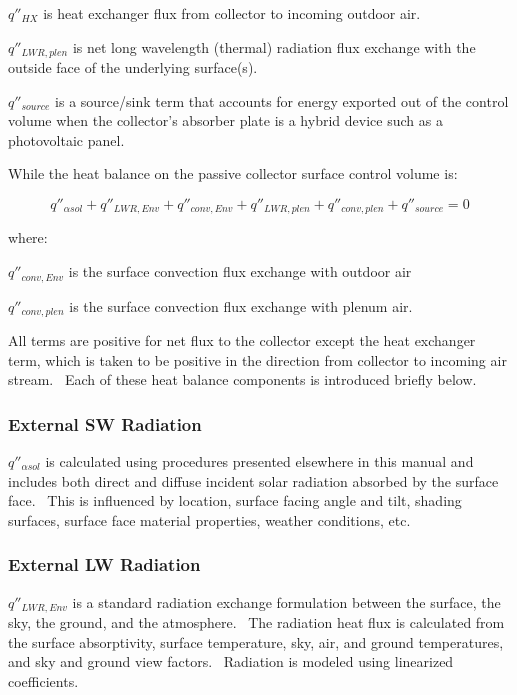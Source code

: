 \(q''_{HX}\) is heat exchanger flux from collector to incoming outdoor air.

\(q''_{LWR,plen}\) is net long wavelength (thermal) radiation flux exchange with the outside face of the underlying surface(s).

\({q''_{source}}\) is a source/sink term that accounts for energy exported out of the control volume when the collector's absorber plate is a hybrid device such as a photovoltaic panel.

While the heat balance on the passive collector surface control volume is:

\begin{equation}
{q''_{\alpha sol}} + {q''_{LWR,Env}} + {q''_{conv,Env}} + {q''_{LWR,plen}} + {q''_{conv,plen}} + {q''_{source}} = 0
\end{equation}

where:

\(q''_{conv,Env}\) is the surface convection flux exchange with outdoor air

\(q''_{conv,plen}\) is the surface convection flux exchange with plenum air.

All terms are positive for net flux to the collector except the heat exchanger term, which is taken to be positive in the direction from collector to incoming air stream.~ Each of these heat balance components is introduced briefly below.

\subsubsection{External SW Radiation}\label{external-sw-radiation-000}

\(q''_{\alpha sol}\) is calculated using procedures presented elsewhere in this manual and includes both direct and diffuse incident solar radiation absorbed by the surface face.~ This is influenced by location, surface facing angle and tilt, shading surfaces, surface face material properties, weather conditions, etc.

\subsubsection{External LW Radiation}\label{external-lw-radiation-000}

\({q''_{LWR,Env}}\) is a standard radiation exchange formulation between the surface, the sky, the ground, and the atmosphere.~ The radiation heat flux is calculated from the surface absorptivity, surface temperature, sky, air, and ground temperatures, and sky and ground view factors.~ Radiation is modeled using linearized coefficients.


